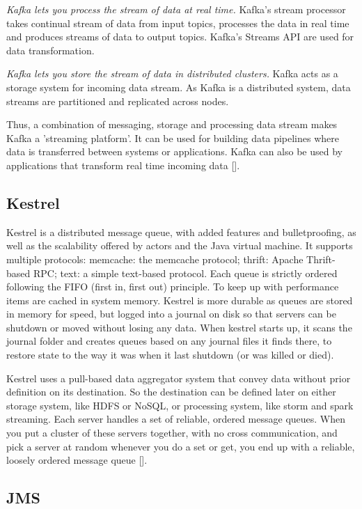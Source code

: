 \textit{Kafka lets you process the stream of data at real time.}
Kafka's stream processor takes continual stream of data from input
topics, processes the data in real time and produces streams of data
to output topics. Kafka's Streams API are used for data
transformation.

\textit{Kafka lets you store the stream of data in distributed
clusters.} Kafka acts as a storage system for incoming data stream. As
Kafka is a distributed system, data streams are partitioned and
replicated across nodes.

Thus, a combination of messaging, storage and processing data stream
makes Kafka a 'streaming platform'. It can be used for building data
pipelines where data is transferred between systems or
applications. Kafka can also be used by applications that transform
real time incoming data [\cite{www-kafka}].

\subsection{Kestrel}
     
Kestrel is a distributed message queue, with added features and
bulletproofing, as well as the scalability offered by actors and the
Java virtual machine. It supports multiple protocols: memcache: the
memcache protocol; thrift: Apache Thrift-based RPC; text: a simple
text-based protocol. Each queue is strictly ordered following the FIFO
(first in, first out) principle. To keep up with performance items are
cached in system memory. Kestrel is more durable as queues are stored
in memory for speed, but logged into a journal on disk so that servers
can be shutdown or moved without losing any data. When kestrel starts
up, it scans the journal folder and creates queues based on any
journal files it finds there, to restore state to the way it was when
it last shutdown (or was killed or died).

Kestrel uses a pull-based data aggregator system that convey data
without prior definition on its destination. So the destination can be
defined later on either storage system, like HDFS or NoSQL, or
processing system, like storm and spark streaming. Each server handles
a set of reliable, ordered message queues. When you put a cluster of
these servers together, with no cross communication, and pick a server
at random whenever you do a set or get, you end up with a reliable,
loosely ordered message queue [\cite{git-kestrel}].

\subsection{JMS}

